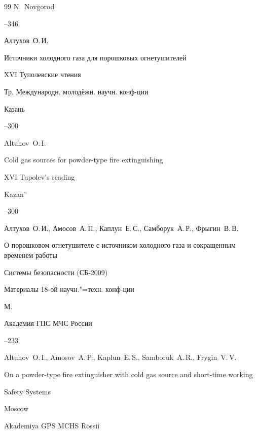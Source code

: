 \begin{thebibliography}{99}
\publaddr N.~Novgorod


--346




\by Алтухов~О.\,И.

\paper Источники холодного газа для порошковых огнетушителей

\inbook XVI Туполевские чтения

\bookinfo  Тр. Международн. молодёжн. научн. конф-ции

\publaddr Казань



--300

\misctransl

\by Altuhov~O.\,I.

\paper Cold gas sources  for powder-type fire extinguishing

\inbook XVI Tupolev's reading

\publaddr Kazan'



--300




\by Алтухов~О.\,И., Амосов~А.\,П., Каплун~Е.\,С., Самборук~А.\,Р., Фрыгин~В.\,В.

\paper О порошковом огнетушителе с источником холодного газа и сокращенным временем работы

\inbook Системы безопасности \rm (СБ-2009)

\bookinfo Материалы 18-ой научн."=техн. конф-ции

\publaddr М.

\publ Академия ГПС МЧС России


--233

\misctransl

\by Altuhov~O.\,I., Amosov~A.\,P., Kaplun~E.\,S., Samboruk~A.\,R., Frygin~V.\,V.

\paper On a powder-type fire extinguisher with cold gas source   and short-time working

\inbook Safety Systems

\publaddr Moscow

\publ Akademiya GPS MCHS Rossii



\end{thebibliography}
